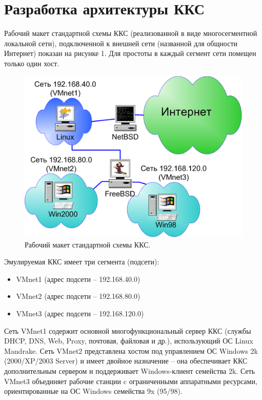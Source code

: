 \documentclass[a4paper, 12pt]{article}		%
\begin{document}

\tableofcontents





\newpage
\section{Разработка архитектуры ККС}

Рабочий макет стандартной схемы ККС (реализованной в виде многосегментной локальной сети), подключенной к внешней сети (названной для общности Интернет) показан на рисунке 1. Для простоты в каждый сегмент сети помещен только один хост.

\begin{figure}[h!]
\centering
\includegraphics[scale=1]{res/network_general}
\caption{Рабочий макет стандартной схемы ККС.}
\end{figure}

Эмулируемая ККС имеет три сегмента (подсети):
\begin{itemize}
\item VMnet1 (адрес подсети – 192.168.40.0)
\item VMnet2 (адрес подсети – 192.168.80.0)
\item VMnet3 (адрес подсети – 192.168.120.0)
\end{itemize}

Сеть VMnet1 содержит основной многофункциональный сервер ККС (службы DHCP, DNS, Web, Proxy, почтовая, файловая и др.), использующий ОС Linux Mandrake. Сеть VMnet2 представлена хостом под управлением ОС Windows 2k (2000/XP/2003 Server) и имеет двойное назначение – она обеспечивает ККС дополнительным сервером и поддерживает Windows-клиент семейства 2k. Сеть VMnet3 объединяет рабочие станции c ограниченными аппаратными ресурсами, ориентированные на ОС Windows семейства 9x (95/98).
\end{document}
